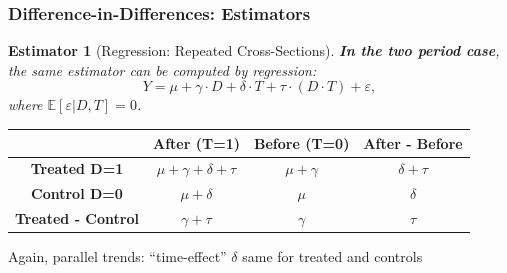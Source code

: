 \documentclass[xcolor=dvipsnames]{beamer}
\newcommand\E{\mathbb{E}}
\newtheorem{esti}{Estimator}
\begin{document}

\begin{frame}
  \frametitle{Difference-in-Differences: Estimators}
\begin{esti}[Regression: Repeated Cross-Sections]\small
\textbf{In the two period case}, the same estimator can be computed by regression:
\[
Y = \mu + \gamma\cdot D + \delta\cdot T + \tau \cdot (D\cdot T) + \varepsilon,
\]
where $\E[\varepsilon|D,T]=0$.
\end{esti}\medskip
{}
\begin{center}
\small
\begin{tabular}{c|c|c|c}

    {\bf } & {\bf After (T=1)} & {\bf Before (T=0)} & {\bf After - Before} \\
\hline \hline
\multirow{2}{*}{{\bf Treated D=1}}  & \multirow{2}{*}{$\mu + \gamma + \delta + \tau$} & \multirow{2}{*}{$\mu + \gamma$} & \multirow{2}{*}{$\delta + \tau$}    \\
 & & & \\
\hline
\multirow{2}{*}{{\bf Control D=0}}   & \multirow{2}{*}{$\mu +  \delta$} & \multirow{2}{*}{$\mu$} & \multirow{2}{*}{$\delta$}    \\
 & & & \\
\hline
\multirow{2}{*}{{\bf Treated - Control}}   & \multirow{2}{*}{$\gamma + \tau$} & \multirow{2}{*}{$\gamma$} & \multirow{2}{*}{$\tau$}    \\
 & & & \\
\hline
\end{tabular}
\end{center}
\small
Again, parallel trends: ``time-effect'' $\delta$ same for treated and controls
\end{frame}
\end{document}
